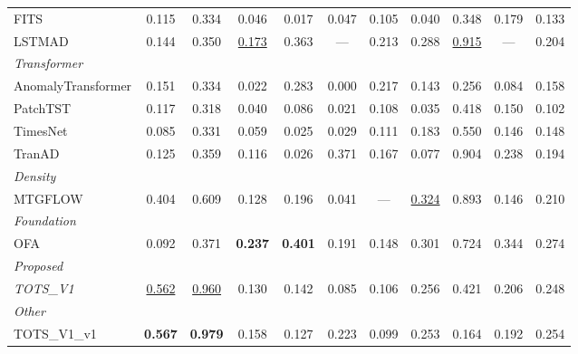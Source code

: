 \begin{table}[t]
\begin{tabular}{lcccccccccc}
FITS & 0.115 & 0.334 & 0.046 & 0.017 & 0.047 & 0.105 & 0.040 & 0.348 & 0.179 & 0.133 \\
LSTMAD & 0.144 & 0.350 & \underline{0.173} & 0.363 & --- & 0.213 & 0.288 & \underline{0.915} & --- & 0.204 \\
\midrule
\multicolumn{11}{l}{\textit{Transformer}} \\
AnomalyTransformer & 0.151 & 0.334 & 0.022 & 0.283 & 0.000 & 0.217 & 0.143 & 0.256 & 0.084 & 0.158 \\
PatchTST & 0.117 & 0.318 & 0.040 & 0.086 & 0.021 & 0.108 & 0.035 & 0.418 & 0.150 & 0.102 \\
TimesNet & 0.085 & 0.331 & 0.059 & 0.025 & 0.029 & 0.111 & 0.183 & 0.550 & 0.146 & 0.148 \\
TranAD & 0.125 & 0.359 & 0.116 & 0.026 & 0.371 & 0.167 & 0.077 & 0.904 & 0.238 & 0.194 \\
\midrule
\multicolumn{11}{l}{\textit{Density}} \\
MTGFLOW & 0.404 & 0.609 & 0.128 & 0.196 & 0.041 & --- & \underline{0.324} & 0.893 & 0.146 & 0.210 \\
\midrule
\multicolumn{11}{l}{\textit{Foundation}} \\
OFA & 0.092 & 0.371 & \textbf{0.237} & \textbf{0.401} & 0.191 & 0.148 & 0.301 & 0.724 & 0.344 & 0.274 \\
\midrule
\multicolumn{11}{l}{\textit{Proposed}} \\
\textit{TOTS\_V1} & \underline{0.562} & \underline{0.960} & 0.130 & 0.142 & 0.085 & 0.106 & 0.256 & 0.421 & 0.206 & 0.248 \\
\midrule
\multicolumn{11}{l}{\textit{Other}} \\
TOTS\_V1\_v1 & \textbf{0.567} & \textbf{0.979} & 0.158 & 0.127 & 0.223 & 0.099 & 0.253 & 0.164 & 0.192 & 0.254 \\
\bottomrule
\end{tabular}
\end{table}

